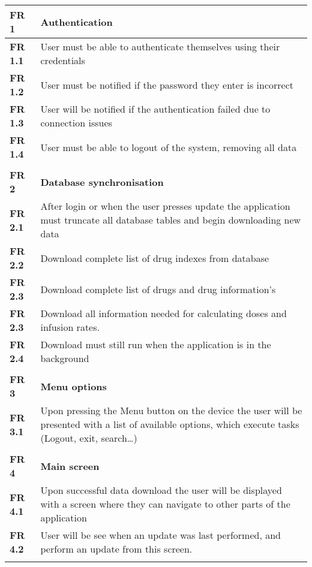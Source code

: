 \begin{center}
\begin{longtable}{| l | p{12cm} |}
\hline
\textbf{FR 1}   & \textbf{Authentication}   \\ \hline
\textbf{FR 1.1} & User must be able to authenticate themselves using their credentials   \\ \hline
\textbf{FR 1.2} & User must be notified if the password they enter is incorrect\\ \hline
\textbf{FR 1.3} & User will be notified if the authentication failed due to connection issues \\ \hline
\textbf{FR 1.4} & User must be able to logout of the system, removing all data \\ \hline
\textbf{}  &  \\ \hline
\textbf{FR 2}   & \textbf{Database synchronisation}   \\ \hline
\textbf{FR 2.1} & After login or when the user presses update the application must truncate all database tables and begin downloading new data  \\ \hline
\textbf{FR 2.2} & Download complete list of drug indexes from database    \\ \hline
\textbf{FR 2.3} & Download complete list of drugs and drug information’s  \\ \hline
\textbf{FR 2.3} & Download all information needed for calculating doses and infusion rates.   \\ \hline
\textbf{FR 2.4} & Download must still run when the application is in the background \\ \hline
\textbf{}  &  \\ \hline
\textbf{FR 3}   & \textbf{Menu options}\\ \hline
\textbf{FR 3.1} & Upon pressing the Menu button on the device the user will be presented with a list of available options, which execute tasks (Logout, exit, search…)   \\ \hline
\textbf{}  &  \\ \hline
\textbf{FR 4}   & \textbf{Main screen} \\ \hline
\textbf{FR 4.1} & Upon successful data download the user will be displayed with a screen where they can navigate to other parts of the application   \\ \hline
\textbf{FR 4.2} & User will be see when an update was last performed, and perform an update from this screen.\\ \hline
\textbf{}  &  \\ \hline

\end{longtable}
\end{center}
